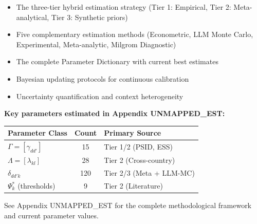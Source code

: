 \begin{itemize}
    \item The three-tier hybrid estimation strategy (Tier 1: Empirical, Tier 2: 
    Meta-analytical, Tier 3: Synthetic priors)
    \item Five complementary estimation methods (Econometric, LLM Monte Carlo, 
    Experimental, Meta-analytic, Milgrom Diagnostic)
    \item The complete Parameter Dictionary with current best estimates
    \item Bayesian updating protocols for continuous calibration
    \item Uncertainty quantification and context heterogeneity
\end{itemize}

\textbf{Key parameters estimated in Appendix UNMAPPED_EST:}
\begin{center}
\begin{tabular}{lcl}
\toprule
\textbf{Parameter Class} & \textbf{Count} & \textbf{Primary Source} \\
\midrule
$\Gamma = [\gamma_{dd'}]$ & 15 & Tier 1/2 (PSID, ESS) \\
$\Lambda = [\lambda_{kl}]$ & 28 & Tier 2 (Cross-country) \\
$\delta_{dd'k}$ & 120 & Tier 2/3 (Meta + LLM-MC) \\
$\Psi^*_k$ (thresholds) & 9 & Tier 2 (Literature) \\
\bottomrule
\end{tabular}
\end{center}

See Appendix UNMAPPED_EST for the complete methodological framework and current parameter 
values.






